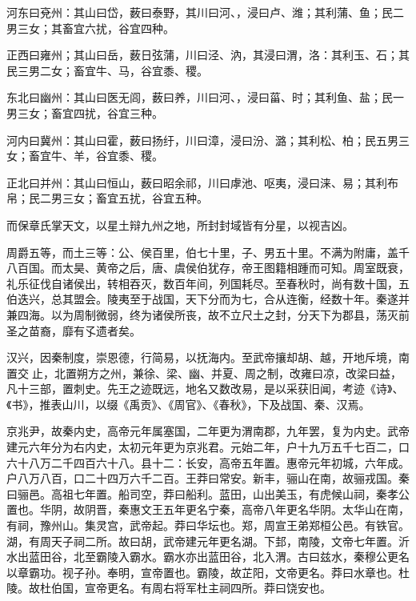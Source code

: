 \documentclass[12pt,UTF8]{ctexbook}
\begin{document}
河东曰兗州：其山曰岱，薮曰泰野，其川曰河、，浸曰卢、潍；其利蒲、鱼；民二男三女；其畜宜六扰，谷宜四种。



正西曰雍州；其山曰岳，薮日弦蒲，川曰泾、汭，其浸曰渭，洛：其利玉、石；其民三男二女；畜宜牛、马，谷宜黍、稷。



东北曰幽州：其山曰医无闾，薮曰养，川曰河、，浸曰菑、时；其利鱼、盐；民一男三女；畜宜四扰，谷宜三种。



河内曰冀州：其山曰霍，薮曰扬纡，川曰漳，浸曰汾、潞；其利松、柏；民五男三女；畜宜牛、羊，谷宜黍、稷。



正北曰并州：其山曰恒山，薮曰昭余祁，川曰虖池、呕夷，浸曰涞、易；其利布帛；民二男三女；畜宜五扰，谷宜五种。



而保章氏掌天文，以星土辩九州之地，所封封域皆有分星，以视吉凶。



周爵五等，而土三等：公、侯百里，伯七十里，子、男五十里。不满为附庸，盖千八百国。而太昊、黄帝之后，唐、虞侯伯犹存，帝王图籍相踵而可知。周室既衰，礼乐征伐自诸侯出，转相吞灭，数百年间，列国耗尽。至春秋时，尚有数十国，五伯迭兴，总其盟会。陵夷至于战国，天下分而为七，合从连衡，经数十年。秦遂并兼四海。以为周制微弱，终为诸侯所丧，故不立尺土之封，分天下为郡县，荡灭前圣之苗裔，靡有孓遗者矣。



汉兴，因秦制度，崇恩德，行简易，以抚海内。至武帝攘却胡、越，开地斥境，南置交止，北置朔方之州，兼徐、梁、幽、并夏、周之制，改雍曰凉，改梁曰益，凡十三部，置刺史。先王之迹既远，地名又数改易，是以采获旧闻，考迹《诗》、《书》，推表山川，以缀《禹贡》、《周官》、《春秋》，下及战国、秦、汉焉。



京兆尹，故秦内史，高帝元年属塞国，二年更为渭南郡，九年罢，复为内史。武帝建元六年分为右内史，太初元年更为京兆君。元始二年，户十九万五千七百二，口六十八万二千四百六十八。县十二：长安，高帝五年置。惠帝元年初城，六年成。户八万八百，口二十四万六千二百。王莽曰常安。新丰，骊山在南，故骊戎国。秦曰骊邑。高祖七年置。船司空，莽曰船利。蓝田，山出美玉，有虎候山祠，秦孝公置也。华阴，故阴晋，秦惠文王五年更名宁秦，高帝八年更名华阴。太华山在南，有祠，豫州山。集灵宫，武帝起。莽曰华坛也。郑，周宣王弟郑桓公邑。有铁官。湖，有周天子祠二所。故曰胡，武帝建元年更名湖。下邽，南陵，文帝七年置。沂水出蓝田谷，北至霸陵入霸水。霸水亦出蓝田谷，北入渭。古曰兹水，秦穆公更名以章霸功。视子孙。奉明，宣帝置也。霸陵，故芷阳，文帝更名。莽曰水章也。杜陵。故杜伯国，宣帝更名。有周右将军杜主祠四所。莽曰饶安也。
\end{document}
